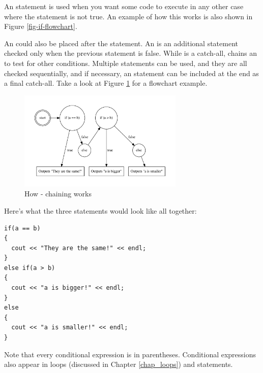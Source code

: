An  statement is used when you want some code to execute in any other case where the  statement is not true. 
An example of how this works is also shown in Figure \ref{fig-if-flowchart}.


An  could also be placed after the  statement. 
An  is an additional  statement checked only when the previous  statement is false. 
While  is a catch-all,  chains an  to test for other conditions. 
Multiple  statements can be used, and they are all checked sequentially, and if necessary, an  statement can be included at the end as a final catch-all. 
Take a look at Figure \ref{fig-else-if-flowchart} for a flowchart example.




\begin{figure}[tbh]
  \centering
  \includegraphics[width=0.7\textwidth]{diagrams/if-else.pdf}
  \caption{How - chaining works} \label{fig-else-if-flowchart}
\end{figure}

Here's what the three statements would look like all together: \nopagebreak[4]

\noindent\begin{minipage}{\linewidth}\begin{lstlisting}
if(a == b)
{
  cout << "They are the same!" << endl;
}
else if(a > b)
{
  cout << "a is bigger!" << endl;
}
else
{
  cout << "a is smaller!" << endl;
}
\end{lstlisting}\end{minipage}

Note that every conditional expression is in parentheses. 
Conditional expressions also appear in loops (discussed in Chapter \ref{chap_loops}) and  statements.

